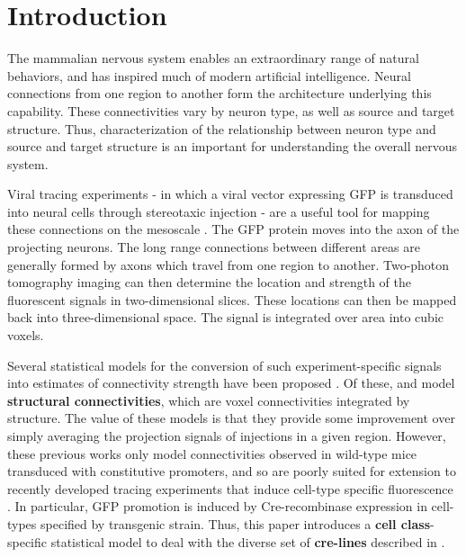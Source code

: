 \section{Introduction}
 
The mammalian nervous system enables an extraordinary range of natural behaviors, and has inspired much of modern artificial intelligence.
Neural connections from one region to another form the architecture underlying this capability.
These connectivities vary by neuron type, as well as source and target structure.
Thus, characterization of the relationship between neuron type and source and target structure is an important for understanding the overall nervous system.

Viral tracing experiments - in which a viral vector expressing GFP is transduced into neural cells through stereotaxic injection - are a useful tool for mapping these connections on the mesoscale \citep{Chamberlin1998-hi,Harris2012-fw, Daigle2018-gd}.
The GFP protein moves into the axon of the projecting neurons. The long range connections between different areas are generally formed by axons which travel from one region to another. 
Two-photon tomography imaging can then determine the location and strength of the fluorescent signals in two-dimensional slices.
These locations can then be mapped back into three-dimensional space.
The signal is integrated over area into cubic voxels.

Several statistical models for the conversion of such experiment-specific signals into estimates of connectivity strength have been proposed \citep{Oh2014-kh, Harris2016-fn, Knox2019-ot}.
Of these, \citet{Oh2014-kh} and \citet{Knox2019-ot} model \textbf{structural connectivities}, which are voxel connectivities integrated by structure.
The value of these models is that they provide some improvement over simply averaging the projection signals of injections in a given region.
However, these previous works only model connectivities observed in wild-type mice transduced with constitutive promoters, and so are poorly suited for extension to recently developed tracing experiments that induce cell-type specific fluorescence \citep{Harris2019-mr}.
In particular, GFP promotion is induced by Cre-recombinase expression in cell-types specified by transgenic strain.
Thus, this paper introduces a \textbf{cell class}-specific statistical model to deal with the diverse set of \textbf{cre-lines} described in \citet{Harris2019-mr}.

